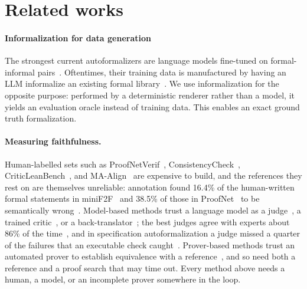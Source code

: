 \documentclass{article}
\newcommand{\shivam}[1]{\textcolor{magenta}{(Shivam: #1)}}
\newcommand{\oren}[1]{\textcolor{teal}{(Oren: #1)}}
\begin{document}
\section{Related works}



\paragraph{Informalization for data generation}
The strongest current autoformalizers are language models fine-tuned on formal-informal pairs~\citep{gao2025herald,kimina2025,lin2025goedel}. Oftentimes, their training data is manufactured by having an LLM informalize an existing formal library~\citep{jiang2023mma,gao2025herald}. We use informalization for the opposite purpose: performed by a deterministic renderer rather than a model, it yields an evaluation oracle instead of training data. This enables an exact ground truth formalization.  

\paragraph{Measuring faithfulness.}
Human-labelled sets such as ProofNetVerif~\citep{poiroux2025reliable}, ConsistencyCheck~\citep{chen2025reform}, CriticLeanBench~\citep{criticlean2025}, and MA-Align~\citep{mathatlas2026} are expensive to build, and the references they rest on are themselves unreliable: annotation found 16.4\% of the human-written formal statements in miniF2F~\citep{zheng2022minif2f} and 38.5\% of those in ProofNet~\citep{azerbayev2023proofnet} to be semantically wrong~\citep{chen2025reform}. Model-based methods trust a language model as a judge~\citep{ying2024leanworkbook,lin2025goedel,kimina2025,mathesis2025}, a trained critic~\citep{lu2025formalalign,criticlean2025}, or a back-translator~\citep{li2024symbolic}; the best judges agree with experts about 86\% of the time~\citep{chen2025reform}, and in specification autoformalization a judge missed a quarter of the failures that an executable check caught~\citep{verusspecgym2026}. Prover-based methods trust an automated prover to establish equivalence with a reference~\citep{liu2025rethinking,poiroux2025reliable,murphy2024leaneuclid}, and so need both a reference and a proof search that may time out. Every method above needs a human, a model, or an incomplete prover somewhere in the loop. 
 
\end{document}
